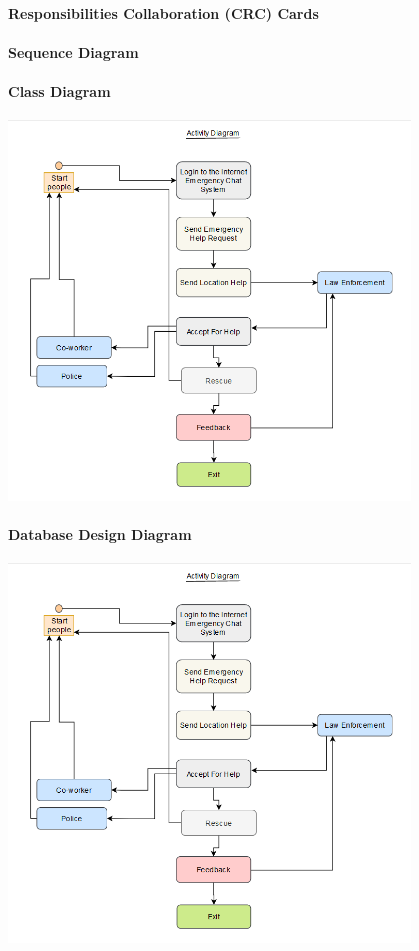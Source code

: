 \documentclass{article}
\begin{document}
\paragraph{Responsibilities Collaboration (CRC) Cards}
\paragraph{Sequence Diagram}


\paragraph{Class Diagram}
\includegraphics[width=0.8\textwidth]{Activity_Diagram.png}


\paragraph{Database Design Diagram}
\includegraphics[width=0.8\textwidth]{Activity_Diagram.png}
\end{document}
